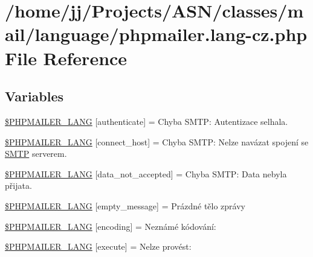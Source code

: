 \hypertarget{phpmailer_8lang-cz_8php}{}\section{/home/jj/\+Projects/\+A\+S\+N/classes/mail/language/phpmailer.lang-\/cz.php File Reference}
\label{phpmailer_8lang-cz_8php}
\subsection*{Variables}
\begin{DoxyCompactItemize}
\item 
\hyperlink{phpmailer_8lang-cz_8php_a2cb33073c989b85580748e331ed8b4aa}{\$\+P\+H\+P\+M\+A\+I\+L\+E\+R\+\_\+\+L\+A\+NG} \mbox{[}\textquotesingle{}authenticate\textquotesingle{}\mbox{]} = \textquotesingle{}Chyba S\+M\+T\+P\+: Autentizace selhala.\textquotesingle{}
\item 
\hyperlink{phpmailer_8lang-cz_8php_a2ee0cc637a06b96e45600db31c6799ee}{\$\+P\+H\+P\+M\+A\+I\+L\+E\+R\+\_\+\+L\+A\+NG} \mbox{[}\textquotesingle{}connect\+\_\+host\textquotesingle{}\mbox{]} = \textquotesingle{}Chyba S\+M\+T\+P\+: Nelze navázat spojení se \hyperlink{class_s_m_t_p}{S\+M\+TP} serverem.\textquotesingle{}
\item 
\hyperlink{phpmailer_8lang-cz_8php_a814c6b191205d2361b3233e9c9d6fda5}{\$\+P\+H\+P\+M\+A\+I\+L\+E\+R\+\_\+\+L\+A\+NG} \mbox{[}\textquotesingle{}data\+\_\+not\+\_\+accepted\textquotesingle{}\mbox{]} = \textquotesingle{}Chyba S\+M\+T\+P\+: Data nebyla přijata.\textquotesingle{}
\item 
\hyperlink{phpmailer_8lang-cz_8php_a33772099f637c9d6c2cd7425e0e37fed}{\$\+P\+H\+P\+M\+A\+I\+L\+E\+R\+\_\+\+L\+A\+NG} \mbox{[}\textquotesingle{}empty\+\_\+message\textquotesingle{}\mbox{]} = \textquotesingle{}Prázdné tělo zprávy\textquotesingle{}
\item 
\hyperlink{phpmailer_8lang-cz_8php_a817f7283f3d54c970a0c10305cc668cc}{\$\+P\+H\+P\+M\+A\+I\+L\+E\+R\+\_\+\+L\+A\+NG} \mbox{[}\textquotesingle{}encoding\textquotesingle{}\mbox{]} = \textquotesingle{}Neznámé kódování\+: \textquotesingle{}
\item 
\hyperlink{phpmailer_8lang-cz_8php_a668217a9563a168f30f2a8548b6ed5a9}{\$\+P\+H\+P\+M\+A\+I\+L\+E\+R\+\_\+\+L\+A\+NG} \mbox{[}\textquotesingle{}execute\textquotesingle{}\mbox{]} = \textquotesingle{}Nelze provést\+: \textquotesingle{}

\end{DoxyCompactItemize}
